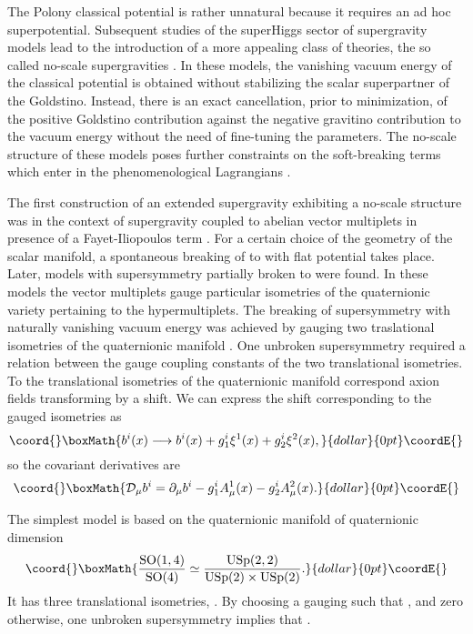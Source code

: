 \documentclass[a4paper,12pt]{article}
\begin{document}
 The Polony classical potential is rather unnatural because it requires an ad hoc
superpotential. Subsequent studies of the superHiggs sector  of supergravity models lead to
the introduction of a more appealing class of theories, the so called no-scale supergravities
\cite{cfkn,elnt}. In these models,  the vanishing vacuum energy of the classical potential is
obtained without stabilizing the scalar superpartner of the Goldstino.  Instead, there is an
exact cancellation, prior to minimization, of the positive Goldstino contribution against the
negative gravitino contribution to the vacuum energy  without the need of fine-tuning the
parameters.
 The no-scale structure of these models poses further constraints on the soft-breaking terms
which enter in the phenomenological Lagrangians \cite{ln}.

 The first construction of an extended supergravity exhibiting a no-scale structure was in the
context of  \coordHE{} supergravity coupled to abelian vector multiplets in presence of a
Fayet-Iliopoulos term \cite{ckpdfwg}. For a certain choice of the geometry of the scalar
manifold, a spontaneous breaking of \coordHE{} to \coordHE{} with flat potential takes place.  Later,
models with \coordHE{} supersymmetry partially broken to \coordHE{} were found. In these models the
vector multiplets gauge  particular isometries of the quaternionic variety pertaining to the
hypermultiplets.  The breaking of  supersymmetry with naturally vanishing vacuum energy was
achieved by gauging  two traslational isometries of the quaternionic manifold \cite{cgp,fgp}.
One unbroken supersymmetry required a relation between the  gauge coupling constants of the
two translational isometries. To the  \coordHE{} translational isometries of the quaternionic
manifold correspond  \coordHE{} axion fields \coordHE{} transforming by a shift. We can express the
shift corresponding to the gauged isometries as
 $$\coord{}\boxMath{b^i(x)\longrightarrow b^i(x) +g_1^i\xi^1(x)+g_2^i\xi^2(x),}{dollar}{0pt}\coordE{}$$
 so the covariant derivatives are
 $$\coord{}\boxMath{\mathcal{D}_\mu b^i=\partial_\mu b^i-g_1^iA_\mu^1(x)-g_2^iA_\mu^2(x).}{dollar}{0pt}\coordE{}$$

 The simplest model \cite{cgp,fgp} is based on the quaternionic manifold of quaternionic
dimension \coordHE{}
 $$\coord{}\boxMath{\frac{\rSO(1,4)}{\rSO(4)}\simeq\frac{\rUSp(2,2)}{\rUSp(2)\times \rUSp(2)}.}{dollar}{0pt}\coordE{}$$
It has three translational isometries, \coordHE{}. By choosing
a gauging such that \coordHE{}, \coordHE{} and zero otherwise,
one unbroken supersymmetry implies that \coordHE{}.
\end{document}
